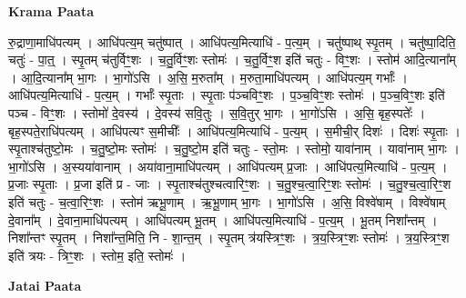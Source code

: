\documentclass[17pt]{extarticle}
\begin{document}
\textbf{Krama Paata} \newline

रु॒द्राणा॒माधि॑पत्यम् । आधि॑पत्य॒म् चतु॑ष्पात् । आधि॑पत्य॒मित्याधि॑ - प॒त्य॒म् । चतु॑ष्पाथ् स्पृ॒तम् । चतु॑ष्पा॒दिति॒ चतुः॑ - पा॒त्॒ । स्पृ॒तम् च॑तुर्विꣳ॒॒शः । च॒तु॒र्विꣳ॒॒शः स्तोमः॑ । च॒तु॒र्विꣳ॒॒श इति॑ चतुः - विꣳ॒॒शः । स्तोम॑ आदि॒त्याना᳚म् । आ॒दि॒त्याना᳚म् भा॒गः । भा॒गो॑ऽसि । अ॒सि॒ म॒रुता᳚म् । म॒रुता॒माधि॑पत्यम् । आधि॑पत्य॒म् गर्भाः᳚ । आधि॑पत्य॒मित्याधि॑ - प॒त्य॒म् । गर्भाः᳚ स्पृ॒ताः । स्पृ॒ताः प॑ञ्चविꣳ॒॒शः । प॒ञ्च॒विꣳ॒॒शः स्तोमः॑ । प॒ञ्च॒विꣳ॒॒शः इति॑ पञ्च - विꣳ॒॒शः । स्तोमो॑ दे॒वस्य॑ । दे॒वस्य॑ सवि॒तुः । स॒वि॒तुर् भा॒गः । भा॒गो॑ऽसि । अ॒सि॒ बृह॒स्पतेः᳚ । बृह॒स्पते॒राधि॑पत्यम् । आधि॑पत्यꣳ स॒मीचीः᳚ । आधि॑पत्य॒मित्याधि॑ - प॒त्य॒म् । स॒मीची॒र् दिशः॑ । दिशः॑ स्पृ॒ताः । स्पृ॒ताश्च॑तुष्टो॒मः । च॒तु॒ष्टो॒मः स्तोमः॑ । च॒तु॒ष्टो॒म इति॑ चतुः - स्तो॒मः । स्तोमो॒ यावा॑नाम् । यावा॑नाम् भा॒गः । भा॒गो॑ऽसि । अ॒स्यया॑वानाम् । अया॑वाना॒माधि॑पत्यम् । आधि॑पत्यम् प्र॒जाः । आधि॑पत्य॒मित्याधि॑ - प॒त्य॒म् । प्र॒जाः स्पृ॒ताः । प्र॒जा इति॑ प्र - जाः । स्पृ॒ताश्च॑तुश्चत्वारिꣳ॒॒शः । च॒तु॒श्च॒त्वा॒रिꣳ॒॒शः स्तोमः॑ । च॒तु॒श्च॒त्वा॒रिꣳ॒॒श इति॑ चतुः - च॒त्वा॒रिꣳ॒॒शः । स्तोम॑ ऋभू॒णाम् । ऋ॒भू॒णाम् भा॒गः । भा॒गो॑ऽसि । अ॒सि॒ विश्वे॑षाम् । विश्वे॑षाम् दे॒वाना᳚म् । दे॒वाना॒माधि॑पत्यम् । आधि॑पत्यम् भू॒तम् । आधि॑पत्य॒मित्याधि॑ - प॒त्य॒म् । भू॒तम् निशा᳚न्तम् । निशा᳚न्तꣳ स्पृ॒तम् । निशा᳚न्त॒मिति॒ नि - शा॒न्त॒म् । स्पृ॒तम् त्र॑यस्त्रिꣳ॒॒शः । त्र॒य॒स्त्रिꣳ॒॒शः स्तोमः॑ । त्र॒य॒स्त्रिꣳ॒॒श इति॑ त्रयः - त्रिꣳ॒॒शः । स्तोम॒ इति॒ स्तोमः॑ । \newline

\textbf{Jatai Paata} \newline
\end{document}
